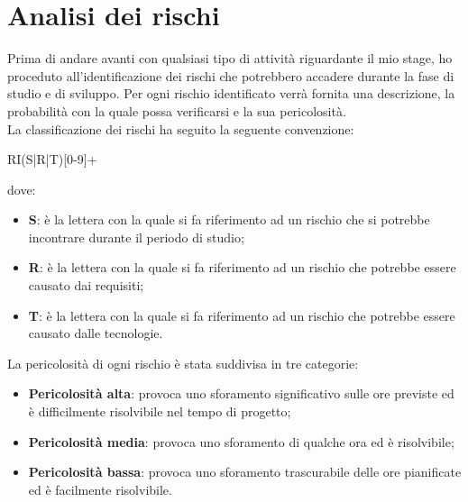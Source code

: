 
\section{Analisi dei rischi}
Prima di andare avanti con qualsiasi tipo di attività riguardante il mio stage, ho proceduto all'identificazione dei rischi che potrebbero accadere durante la fase di studio e di sviluppo. 
Per ogni rischio identificato verrà fornita una descrizione, la probabilità con la quale possa verificarsi e la sua pericolosità. \\

\noindent La classificazione dei rischi ha seguito la seguente convenzione:
\begin{center}
  RI(S|R|T)[0-9]+
\end{center}
dove:
\begin{itemize}
  \item \textbf{S}: è la lettera con la quale si fa riferimento ad un rischio che si potrebbe incontrare durante il periodo di studio;
  \item \textbf{R}: è la lettera con la quale si fa riferimento ad un rischio che potrebbe essere causato dai requisiti;
  \item \textbf{T}: è la lettera con la quale si fa riferimento ad un rischio che potrebbe essere causato dalle tecnologie.
\end{itemize}

\noindent La pericolosità di ogni rischio è stata suddivisa in tre categorie:
\begin{itemize}
  \item \textbf{Pericolosità alta}: provoca uno sforamento significativo sulle ore previste ed è difficilmente risolvibile nel tempo di progetto;
  \item \textbf{Pericolosità media}: provoca uno sforamento di qualche ora ed è risolvibile;
  \item \textbf{Pericolosità bassa}: provoca uno sforamento trascurabile delle ore pianificate ed è facilmente risolvibile.
\end{itemize}

